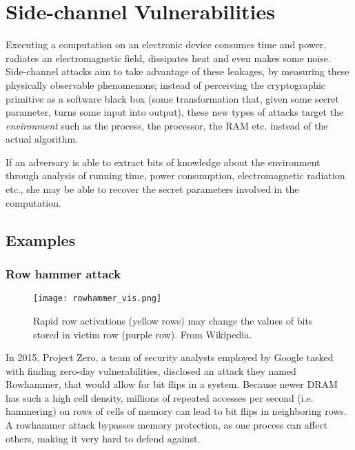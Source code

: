 \section{Side-channel Vulnerabilities}
Executing a computation on an electronic device consumes time and power, radiates an electromagnetic field, dissipates heat and even makes some noise\cite{Gnad_Krautter_Tahoori_2019}. 
Side-channel attacks aim to take advantage of these leakages, by measuring these physically observable phenomenons; instead of perceiving the cryptographic primitive as a software black box (some transformation that, given some secret parameter, turns some input into output), these new types of attacks target the \emph{environment} such as the process, the processor, the RAM etc. instead of the actual algorithm.

If an adversary is able to extract bits of knowledge about the environment through analysis of running time, power consumption, electromagnetic radiation etc., she may be able to recover the secret parameters involved in the computation.

\subsection{Examples}
\subsubsection{Row hammer attack}

\begin{figure}[tp]
  \begin{center}
    \texttt{[image: rowhammer\_vis.png]}
  \end{center}
  \caption{Rapid row activations (yellow rows) may change the values of bits stored in victim row (purple row). From Wikipedia\cite{wiki_rowhammer}.}
\end{figure}

In 2015, Project Zero, a team of security analysts employed by Google tasked with finding zero-day vulnerabilities, disclosed an attack they named Rowhammer, that would allow for bit flips in a system.
Because newer DRAM has such a high cell density, millions of repeated accesses per second (i.e. hammering) on rows of cells of memory can lead to bit flips in neighboring rows.
A rowhammer attack bypasses memory protection, as one process can affect others, making it very hard to defend against.

%

